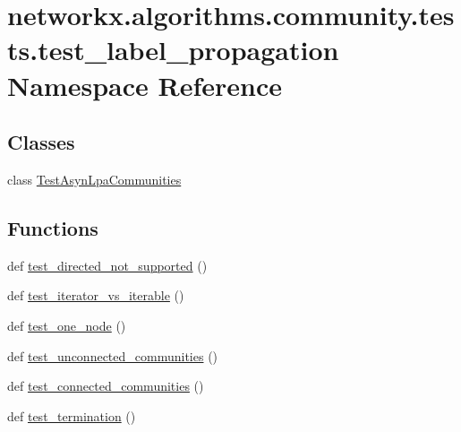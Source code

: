 \hypertarget{namespacenetworkx_1_1algorithms_1_1community_1_1tests_1_1test__label__propagation}{}\section{networkx.\+algorithms.\+community.\+tests.\+test\+\_\+label\+\_\+propagation Namespace Reference}
\label{namespacenetworkx_1_1algorithms_1_1community_1_1tests_1_1test__label__propagation}
\subsection*{Classes}
\begin{DoxyCompactItemize}
\item 
class \hyperlink{classnetworkx_1_1algorithms_1_1community_1_1tests_1_1test__label__propagation_1_1TestAsynLpaCommunities}{Test\+Asyn\+Lpa\+Communities}
\end{DoxyCompactItemize}
\subsection*{Functions}
\begin{DoxyCompactItemize}
\item 
def \hyperlink{namespacenetworkx_1_1algorithms_1_1community_1_1tests_1_1test__label__propagation_ac2dae867022965b55fb78ae9d638ff12}{test\+\_\+directed\+\_\+not\+\_\+supported} ()
\item 
def \hyperlink{namespacenetworkx_1_1algorithms_1_1community_1_1tests_1_1test__label__propagation_ab6952bb0bdd1c694f2c401f0fcad3092}{test\+\_\+iterator\+\_\+vs\+\_\+iterable} ()
\item 
def \hyperlink{namespacenetworkx_1_1algorithms_1_1community_1_1tests_1_1test__label__propagation_ac32c2531927514154e194dbc206531ea}{test\+\_\+one\+\_\+node} ()
\item 
def \hyperlink{namespacenetworkx_1_1algorithms_1_1community_1_1tests_1_1test__label__propagation_aba583eb1b1ce38c1f14e7bf1fed3db6d}{test\+\_\+unconnected\+\_\+communities} ()
\item 
def \hyperlink{namespacenetworkx_1_1algorithms_1_1community_1_1tests_1_1test__label__propagation_a0220909916bb83f93748d40d639ad50f}{test\+\_\+connected\+\_\+communities} ()
\item 
def \hyperlink{namespacenetworkx_1_1algorithms_1_1community_1_1tests_1_1test__label__propagation_aa2da4f9163cf3e5c6bfd01b95119b688}{test\+\_\+termination} ()
\end{DoxyCompactItemize}


